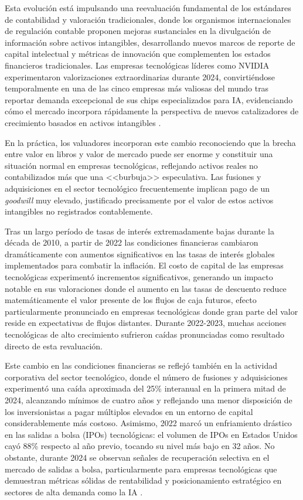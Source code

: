 Esta evolución está impulsando una reevaluación fundamental de los estándares de contabilidad y valoración tradicionales, donde los organismos internacionales de regulación contable proponen mejoras sustanciales en la divulgación de información sobre activos intangibles, desarrollando nuevos marcos de reporte de capital intelectual y métricas de innovación que complementen los estados financieros tradicionales. Las empresas tecnológicas líderes como NVIDIA experimentaron valorizaciones extraordinarias durante 2024, convirtiéndose temporalmente en una de las cinco empresas más valiosas del mundo tras reportar demanda excepcional de sus chips especializados para IA, evidenciando cómo el mercado incorpora rápidamente la perspectiva de nuevos catalizadores de crecimiento basados en activos intangibles \citep{nvidia2024}.

En la práctica, los valuadores incorporan este cambio reconociendo que la brecha entre valor en libros y valor de mercado puede ser enorme y constituir una situación normal en empresas tecnológicas, reflejando activos reales no contabilizados más que una <<burbuja>> especulativa. Las fusiones y adquisiciones en el sector tecnológico frecuentemente implican pago de un \emph{goodwill} muy elevado, justificado precisamente por el valor de estos activos intangibles no registrados contablemente.

Tras un largo período de tasas de interés extremadamente bajas durante la década de 2010, a partir de 2022 las condiciones financieras cambiaron dramáticamente con aumentos significativos en las tasas de interés globales implementados para combatir la inflación. El costo de capital de las empresas tecnológicas experimentó incrementos significativos, generando un impacto notable en sus valoraciones donde el aumento en las tasas de descuento reduce matemáticamente el valor presente de los flujos de caja futuros, efecto particularmente pronunciado en empresas tecnológicas donde gran parte del valor reside en expectativas de flujos distantes. Durante 2022-2023, muchas acciones tecnológicas de alto crecimiento sufrieron caídas pronunciadas como resultado directo de esta revaluación.

Este cambio en las condiciones financieras se reflejó también en la actividad corporativa del sector tecnológico, donde el número de fusiones y adquisiciones experimentó una caída aproximada del 25\% interanual en la primera mitad de 2024, alcanzando mínimos de cuatro años y reflejando una menor disposición de los inversionistas a pagar múltiplos elevados en un entorno de capital considerablemente más costoso. Asimismo, 2022 marcó un enfriamiento drástico en las salidas a bolsa (IPOs) tecnológicas: el volumen de IPOs en Estados Unidos cayó 88\% respecto al año previo, tocando su nivel más bajo en 32 años. No obstante, durante 2024 se observan señales de recuperación selectiva en el mercado de salidas a bolsa, particularmente para empresas tecnológicas que demuestran métricas sólidas de rentabilidad y posicionamiento estratégico en sectores de alta demanda como la IA \citep{renaissance2024}.

